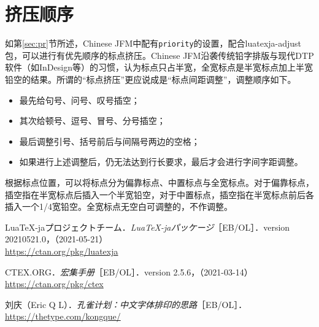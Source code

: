 \documentclass[a4paper , zihao=-4 , fontset=adobe , punct=zh_CN/kaiming]{ctexart}
\begin{document}
\section{挤压顺序}
如第\ref{sec:pr}节所述，\textsf{Chinese JFM}中配有\+\verb|priority|的设置，配合\textsf{luatexja-adjust}包，可以进行有优先顺序的标点挤压。\textsf{Chinese JFM}沿袭传统铅字排版与现代DTP软件（如InDesign等）的习惯，认为标点只占半宽，全宽标点是半宽标点加上半宽铅空的结果。所谓的“标点挤压”更应说成是“标点间距调整”，调整顺序如下。
\begin{itemize}
    \item 最先给句号、问号、叹号插空；
    \item 其次给顿号、逗号、冒号、分号插空；
    \item 最后调整引号、括号前后与间隔号两边的空格；
    \item 如果进行上述调整后，仍无法达到行长要求，最后才会进行字间字距调整。
\end{itemize}

根据标点位置，可以将标点分为偏靠标点、中置标点与全宽标点。对于偏靠标点，插空指在半宽标点后插入一个半宽铅空，对于中置标点，插空指在半宽标点前后各插入一个1/4宽铅空。全宽标点无空白可调整的，不作调整。

\nocite{*}
\begin{thebibliography}{9}
     Lua\TeX-jaプロジェクトチーム．\textit{Lua\TeX-jaパッケージ}［EB/OL］．version 20210521.0，（2021-05-21）\\\mbox{}
    \hfill\url{https://ctan.org/pkg/luatexja}

     CTEX.ORG．\textit{\CTeX{}宏集手册}［EB/OL］．version 2.5.6，（2021-03-14）\\\mbox{}
    \hfill\url{https://ctan.org/pkg/ctex}

     刘庆（Eric Q L）．\textit{孔雀计划：中文字体排印的思路}［EB/OL］．\\\mbox{}
    \hfill\url{https://thetype.com/kongque/}
\end{thebibliography}
\end{document}

